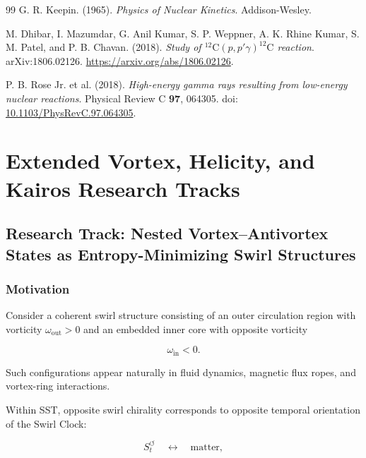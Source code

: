 \begin{thebibliography}{99}
        G. R. Keepin. (1965).
        \textit{Physics of Nuclear Kinetics}.
        Addison-Wesley.
        
        M. Dhibar, I. Mazumdar, G. Anil Kumar, S. P. Weppner, A. K. Rhine Kumar, S. M. Patel, and P. B. Chavan. (2018).
        \textit{Study of \(^{12}\mathrm C(p,p'\gamma)^{12}\mathrm C\) reaction}.
        arXiv:1806.02126.
        \href{https://arxiv.org/abs/1806.02126}{https://arxiv.org/abs/1806.02126}.
        
        P. B. Rose Jr. et al. (2018).
        \textit{High-energy gamma rays resulting from low-energy nuclear reactions}.
        Physical Review C \textbf{97}, 064305.
        doi: \href{https://doi.org/10.1103/PhysRevC.97.064305}{10.1103/PhysRevC.97.064305}.
    
    \end{thebibliography}
\fi




\section{Extended Vortex, Helicity, and Kairos Research Tracks}

\subsection{Research Track: Nested Vortex--Antivortex States as Entropy-Minimizing Swirl Structures}
    
    \subsubsection{Motivation}
        
        Consider a coherent swirl structure consisting of an outer circulation region
        with vorticity $\omega_{\mathrm{out}}>0$ and an embedded inner core with
        opposite vorticity
        
        \[
            \omega_{\mathrm{in}}<0.
        \]
        
        Such configurations appear naturally in fluid dynamics, magnetic flux ropes,
        and vortex-ring interactions.
        
        Within SST, opposite swirl chirality corresponds to opposite temporal
        orientation of the Swirl Clock:
        
        \[
            S_t^{\circlearrowleft}
            \quad\leftrightarrow\quad
            \text{matter},
        \]
        
